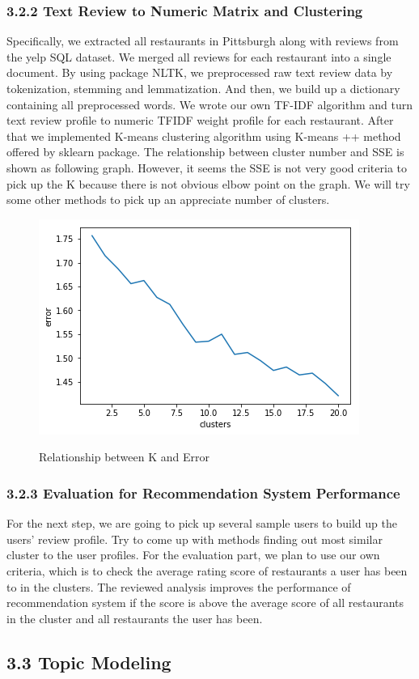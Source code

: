 \documentclass{neu_handout}
\begin{document}
\subsubsection*{3.2.2 Text Review to Numeric Matrix and Clustering}
Specifically, we extracted all restaurants in Pittsburgh along with reviews from the yelp SQL dataset. We merged all reviews for each restaurant into a single document. By using package NLTK, we preprocessed raw text review data by tokenization, stemming and lemmatization. And then, we build up a dictionary containing all preprocessed words. We wrote our own TF-IDF algorithm and turn text review profile to numeric TFIDF weight profile for each restaurant. After that we implemented K-means clustering algorithm using K-means ++ method offered by sklearn package. The relationship between cluster number and SSE is shown as following graph. However, it seems the SSE is not very good criteria to pick up the K because there is not obvious elbow point on the graph. We will try some other methods to pick up an appreciate number of clusters. 

\begin{figure}[h]
\centering
{
\includegraphics[width=0.4\linewidth]{KvsError}
}
\caption{Relationship between K and Error}
\end{figure}

\subsubsection*{3.2.3 Evaluation for Recommendation System Performance}
For the next step, we are going to pick up several sample users to build up the users’ review profile. Try to come up with methods finding out most similar cluster to the user profiles. For the evaluation part, we plan to use our own criteria, which is to check the average rating score of restaurants a user has been to in the clusters. The reviewed analysis improves the performance of recommendation system if the score is above the average score of all restaurants in the cluster and all restaurants the user has been. 
 
\subsection*{3.3 Topic Modeling}
\end{document}
